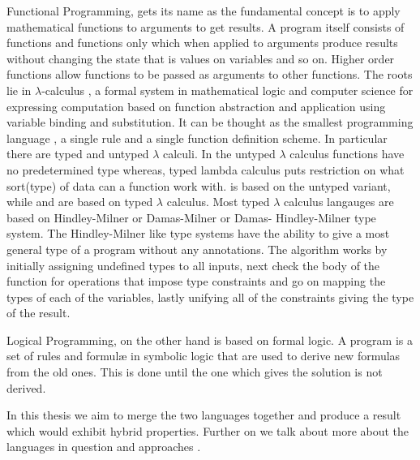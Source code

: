 \documentclass[thesis-solanki.tex]{subfiles}
\begin{document}
Functional Programming, \cite{hughes1989functional} gets its name as the fundamental concept is to apply
mathematical functions to arguments to get results.
A program itself consists of functions and functions only which when applied to arguments produce results without
changing the state that is values on variables and so on.
Higher order functions allow functions to be passed as arguments to other functions.
The roots lie in $\lambda$-calculus \cite{website:lambdacalculuswiki}, a formal system in mathematical logic and
computer science for expressing computation based on function abstraction and application using variable binding
and substitution.
It can be thought as the smallest programming language \cite{rojas2004tutorial}, a single rule and a single
function definition scheme.
In particular there are typed and untyped $\lambda$ calculi.
In the untyped $\lambda$ calculus functions have no predetermined type whereas{\large,} typed lambda calculus puts
restriction on what sort(type) of data can a function work with.
 is based on the untyped variant{\large,} while  and  are based on typed
$\lambda$ calculus.
Most typed $\lambda$ calculus langauges are based on Hindley-Milner or Damas-Milner or Damas- Hindley-Milner
 type system.
The Hindley-Milner like type systems have the ability to give a most general type of a program without any
annotations. 
The algorithm \cite{website:hdmtypesystem} works by initially assigning undefined types to all inputs, next check
the body of the function for operations that impose type constraints and go on mapping the types of each of the
variables, lastly unifying all of the constraints giving the type of the result.

Logical Programming, \cite{spivey1995introduction} on the other hand is based on formal logic.
A program is a set of rules and formul\ae{} in symbolic logic that are used to derive new formulas from the old
ones.
This is done until the one which gives the solution is not derived.

In this thesis we aim to merge the two languages
together and produce a result which would exhibit hybrid
properties.
Further on we talk about more about the languages in question and approaches .
\end{document}
